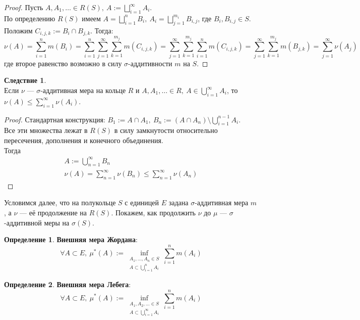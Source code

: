 \documentclass[11pt,a4paper]{report}
\theoremstyle{definition}
\theoremstyle{definition}
\newtheorem{corollary}{Следствие}[section]
\theoremstyle{definition}
\newtheorem{definition}{Определение}[section]
\begin{document}
	\begin{proof}
		Пусть $ A, A_{1}, \dots \in R(S),\ A := \bigsqcup_{i=1}^{\infty}{A_{i}} $.\\
		По определению $ R(S) $ имеем $ A = \bigsqcup_{i=1}^{n}{B_{i}},\ A_{i} = \bigsqcup_{j=1}^{m_{i}}{B_{i, j}} $, где $ B_{i}, B_{i, j} \in S $.\\
		Положим $ C_{i, j, k} := B_{i} \cap B_{j, k} $. Тогда: 
		\[ \nu(A) = \sum_{i=1}^{n}{m(B_{i})} = \sum_{i=1}^{n}{\sum_{j=1}^{\infty}{\sum_{k=1}^{m_{j}}{m(C_{i, j, k})}}} = \sum_{j=1}^{\infty}{\sum_{k=1}^{m_{j}}{\sum_{i=1}^{n}{m(C_{i, j, k})}}} = \sum_{j=1}^{\infty}{\sum_{k=1}^{m_{j}}{m(B_{j, k})}} = \sum_{j=1}^{\infty}{\nu(A_{j})} \]
		где второе равенство возможно в силу $ \sigma $-аддитивности $ m $ на $ S $.
	\end{proof}
	\begin{corollary}$  $\\
		Если $ \nu $ — $ \sigma $-аддитивная мера на кольце $ R $ и $ A, A_{1}, \dots \in R,\ A \in \bigcup_{i=1}^{\infty}{A_{i}} $, то $ \nu(A) \le \sum_{i=1}^{\infty}{\nu(A_{i})} $.
	\end{corollary}
	\begin{proof}
		Стандартная конструкция: $ B_{1} := A \cap A_{1},\ B_{n} := (A \cap A_{n}) \setminus \bigcup\limits_{i=1}^{n-1} A_{i} $.\\
		Все эти множества лежат в $ R(S) $ в силу замкнутости относительно пересечения, дополнения и конечного объединения.\\
		Тогда 
		\begin{gather*} 
			A := \bigcup\limits_{n=1}^{\infty} B_{n}\\
			\nu(A) = \sum\limits_{n=1}^{\infty} \nu(B_{n}) \le \sum\limits_{n=1}^{\infty} \nu(A_{n})
		\end{gather*}
	\end{proof}
	\noindent Условимся далее, что на полукольце $ S $ с единицей $ E $ задана $ \sigma $-аддитивная мера $ m $, а $ \nu $ — её продолжение на $ R(S) $. Покажем, как продолжить $ \nu $ до $ \mu $ — $ \sigma $-аддитивной меры на $ \sigma(S) $.
	\begin{definition}
		\textbf{Внешняя мера Жордана}:
		\[ \forall A \subset E,\ \mu^{*}(A) := \inf_{\substack{A_{1}, \dots, A_{n} \in S\\A\subset\bigcup_{i=1}^{n}{A_{i}}}}{\sum_{i=1}^{n}{m(A_{i})}} \]
	\end{definition}
	\begin{definition}
		\textbf{Внешняя мера Лебега}:
		\[ \forall A \subset E,\ \mu^{*}(A) := \inf_{\substack{A_{1}, A_{2}, \dots \in S\\A\subset\bigcup_{i=1}^{\infty}{A_{i}}}}{\sum_{i=1}^{n}{m(A_{i})}} \]
	\end{definition}
\end{document}
